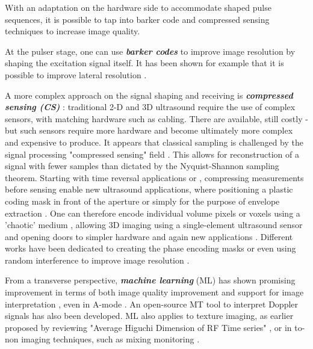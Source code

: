 \documentclass{article}
\begin{document}
With an adaptation on the hardware side to accommodate shaped pulse sequences, it is possible to tap into barker code and compressed sensing techniques to increase image quality.

At the pulser stage, one can use \textbf{\textit{barker codes}} to  improve image resolution by shaping the excitation signal itself. It has been shown for example that it is possible to improve lateral resolution  \cite{fujita_effect_2017, chun_ultrasound_2015, kim_real-time_2018}.

A more complex approach on the signal shaping and receiving is \textbf{\textit{compressed sensing (CS)}} : traditional 2-D and 3D ultrasound require the use of complex sensors, with matching hardware such as cabling. There are available, still costly - but such sensors require more hardware and become ultimately more complex and expensive to produce. 
It appears that classical sampling is challenged by the signal processing "compressed sensing" field \cite{liutkus_imaging_2014,hua_compressed_2011}. This allows for reconstruction of a signal with fewer samples than dictated by the Nyquist-Shannon sampling theorem. Starting with time reversal applications \cite{montaldo_time_2004, montaldo_building_2005} or \cite{sarvazyan_comparative_2009}, compressing measurements before sensing enable new ultrasound applications, where positioning a plastic coding mask in front of the aperture \cite{fedjajevs_ultrasound_2016} or simply for the purpose of envelope extraction \cite{kim_signal-processing_2020}.  One can therefore encode individual volume pixels or voxels using a 'chaotic' medium  \cite{luong_compact_2016}, allowing 3D imaging using a single-element ultrasound sensor and opening doors to simpler hardware and again new applications \cite{kruizinga_compressive_2017}. Different works have been dedicated to creating the phase encoding masks \cite{van_der_meulen_spatial_2017} or even using random interference to improve image resolution \cite{ni_high-resolution_2020}.


From a transverse perspective, \textbf{\textit{machine learning}} (ML) has shown promising improvement in terms of both image quality improvement \cite{wang_high-resolution_2019, hewener_mobile_2019} and support for image interpretation \cite{divya_krishna_computer_2016}, even in A-mode \cite{brausch_classifying_2019}. An open-source MT tool to interpret Doppler signals \cite{dhutia_open-source_2017} has also been developed. ML also applies to texture imaging, as earlier proposed by reviewing "Average Higuchi Dimension of RF Time series" \cite{moradi_detection_2006}, or in to-non imaging techniques, such as mixing monitoring \cite{bowler_monitoring_2020}.
\end{document}
